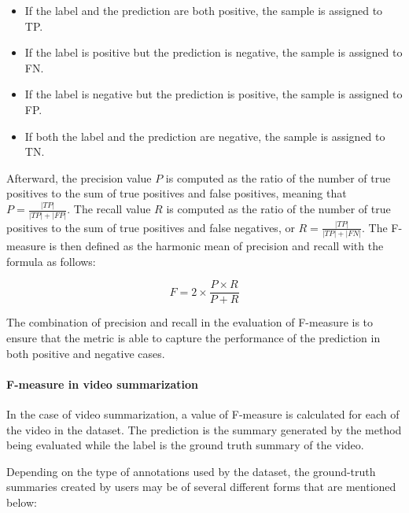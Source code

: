             \begin{itemize}
                \item If the label and the prediction are both positive, the sample is assigned to TP.
                \item If the label is positive but the prediction is negative, the sample is assigned to FN.
                \item If the label is negative but the prediction is positive, the sample is assigned to FP.
                \item If both the label and the prediction are negative, the sample is assigned to TN.
            \end{itemize}

            Afterward, the precision value $P$ is computed as the ratio of the number of true positives to the sum of true positives and false positives, meaning that $P = \frac{|TP|}{|TP| + |FP|}$. The recall value $R$ is computed as the ratio of the number of true positives to the sum of true positives and false negatives, or $R = \frac{|TP|}{|TP| + |FN|}$. The F-measure is then defined as the harmonic mean of precision and recall with the formula as follows:

            \begin{equation}
                \label{eq:f-measure}
                F = 2 \times \frac{P \times R}{P + R}
            \end{equation}

            The combination of precision and recall in the evaluation of F-measure is to ensure that the metric is able to capture the performance of the prediction in both positive and negative cases. 
        
        \paragraph[long]{F-measure in video summarization}
            In the case of video summarization, a value of F-measure is calculated for each of the video in the dataset. The prediction is the summary generated by the method being evaluated while the label is the ground truth summary of the video.
            
            Depending on the type of annotations used by the dataset, the ground-truth summaries created by users may be of several different forms that are mentioned below:

